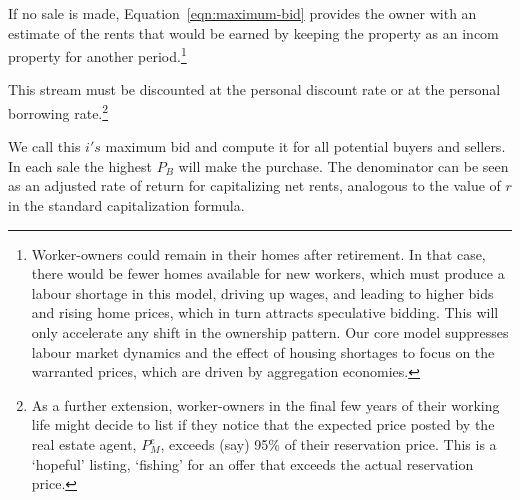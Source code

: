 {If no sale is made, Equation~\ref{eqn:maximum-bid} provides the owner with an estimate of the rents that would be earned by keeping the property as an incom property for another period.\footnote{Worker-owners could remain in their homes after retirement. In that case,  there would be fewer homes available for new workers, which must produce a labour shortage in this model, driving up wages, and leading to higher bids and rising home prices, which in turn attracts  speculative bidding. This will only accelerate any shift in the ownership pattern. Our core model suppresses labour market dynamics and the effect of housing shortages to focus on the warranted prices, which are driven by aggregation economies.}  

 This stream must be discounted at the personal discount rate or at the personal borrowing rate.\footnote{As a further extension, worker-owners in the final few years of their working life might decide to list if they notice that the expected price posted by the real estate agent, $P_M^e$,  exceeds (say) 95\% of their reservation price. This is a `hopeful' listing, `fishing' for an offer that exceeds the actual reservation price.}



We call this  $i's$ maximum bid and compute it for all potential buyers and sellers. In each sale the highest $P_B$ will make the purchase. The denominator can be seen as an adjusted rate of return for capitalizing net rents, analogous to the value of $r$ in  the standard capitalization formula. 

{\color{red}

}}
